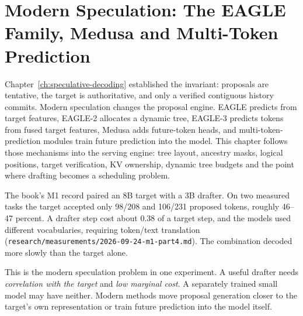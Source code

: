 \chapter{Modern Speculation: The EAGLE Family, Medusa and Multi-Token Prediction}\label{ch:modern-speculation}

\begin{ChapterIntent}
Chapter~\ref{ch:speculative-decoding} established the invariant: proposals are tentative,
the target is authoritative, and only a verified contiguous history commits. Modern
speculation changes the proposal engine. EAGLE predicts from target features, EAGLE-2
allocates a dynamic tree, EAGLE-3 predicts tokens from fused target features, Medusa
adds future-token heads, and multi-token-prediction modules train future prediction
into the model. This chapter follows those mechanisms into the serving engine: tree
layout, ancestry masks, logical positions, target verification, KV ownership, dynamic
tree budgets and the point where drafting becomes a scheduling problem.
\end{ChapterIntent}


The book's M1 record paired an 8B target with a 3B drafter. On two measured tasks the
target accepted only 98/208 and 106/231 proposed tokens, roughly 46--47 percent. A
drafter step cost about 0.38 of a target step, and the models used different
vocabularies, requiring token/text translation
(\texttt{research/measurements/2026-09-24-m1-part4.md}). The combination decoded more
slowly than the target alone.

This is the modern speculation problem in one experiment. A useful drafter needs
\emph{correlation with the target} and \emph{low marginal cost}. A separately trained
small model may have neither. Modern methods move proposal generation closer to the
target's own representation or train future prediction into the model itself.


